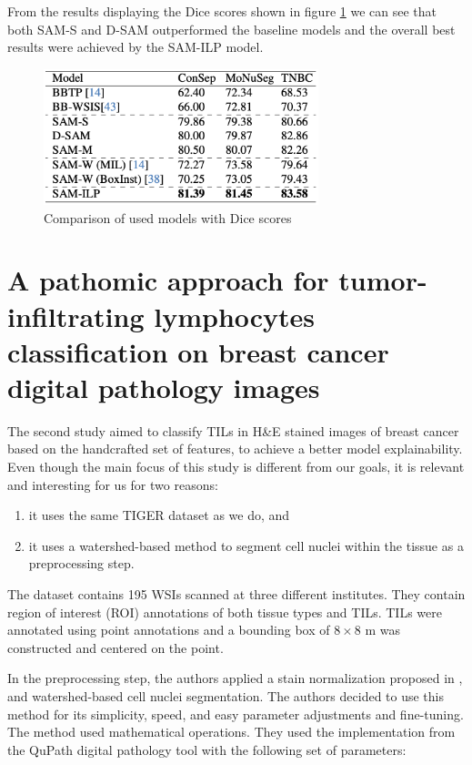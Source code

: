 From the results displaying the Dice scores shown in figure \ref{fig:rw-sam-dice} we can see that both SAM-S and D-SAM outperformed the baseline models and the overall best results were achieved by the SAM-ILP model.

\begin{figure}[H]
    \begin{centering}
    \includegraphics[width=8cm]{assets/images/rw-table-dice.png}
    \par\end{centering}
    \caption{Comparison of used models with Dice scores}
    \label{fig:rw-sam-dice}
\end{figure}

\section{A pathomic approach for tumor-infiltrating lymphocytes classification on breast cancer digital pathology images \cite{Verdicchio2023}}
The second study aimed to classify TILs in H\&E stained images of breast cancer based on the handcrafted set of features, to achieve a better model explainability. Even though the main focus of this study is different from our goals, it is relevant and interesting for us for two reasons:

\begin{enumerate}
    \item it uses the same TIGER dataset \cite{tiger_dataset} as we do, and
    \item it uses a watershed-based method to segment cell nuclei within the tissue as a preprocessing step.
\end{enumerate}

The dataset contains 195 WSIs scanned at three different institutes. They contain region of interest (ROI) annotations of both tissue types and TILs. TILs were annotated using point annotations and a bounding box of $8 \!\times\! 8$ \textmu m was constructed and centered on the point.

In the preprocessing step, the authors applied a stain normalization proposed in \cite{Vahadane2015}, and watershed-based cell nuclei segmentation. The authors decided to use this method for its simplicity, speed, and easy parameter adjustments and fine-tuning. The method used mathematical operations. They used the implementation from the QuPath digital pathology tool with the following set of parameters:

